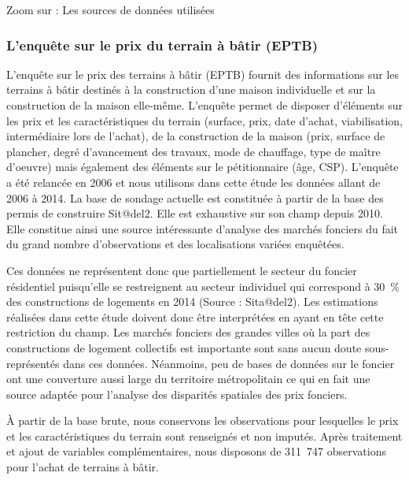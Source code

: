 \documentclass[10.5pt,a4paper]{article}
\newcommand\cadrevert[3]{
\begin{encadre}

\color{vert_n} \fontsize{14}{13}\selectfont Zoom sur : \color{black} \fontsize{14}{13}\selectfont #1
\vspace{4mm}


\color{vert_n} \fontsize{9}{10}\selectfont #2

{\setlength{\parindent}{5mm}%
\color{vert_n} \fontsize{9}{10}\selectfont #3
}
\end{encadre}
}
\begin{document}
{\newpage

\cadrevert{Les sources de données utilisées}{\subsubsection{L’enquête sur le prix du terrain à bâtir (EPTB)}

L’enquête sur le prix des terrains à bâtir (EPTB) fournit des informations sur les terrains à bâtir destinés à la construction d’une maison individuelle et sur la construction de la maison elle-même. L’enquête permet de disposer d’éléments sur les prix et les caractéristiques du terrain (surface, prix, date d’achat, viabilisation, intermédiaire lors de l'achat), de la construction de la maison 
(prix, surface de plancher, degré d’avancement des travaux, mode de chauffage, type de maître d’oeuvre) mais également des éléments sur le
pétitionnaire (âge, CSP). L’enquête a été relancée en 2006 et nous utilisons dans cette étude les données allant de 2006 à 2014. La base de sondage actuelle est constituée à partir de la base des permis de construire Sit@del2. Elle est exhaustive sur son champ depuis 2010. Elle constitue ainsi une source intéressante d'analyse des marchés fonciers du fait du grand nombre d'observations et des localisations variées enquêtées.\par}{  

Ces données ne représentent donc que partiellement le secteur du foncier résidentiel puisqu'elle se restreignent au secteur individuel qui correspond à 30~\% des constructions de logements en 2014 (Source : Sita@del2). Les estimations réalisées dans cette étude doivent donc être interprétées en ayant en tête cette restriction du champ. Les marchés fonciers des grandes villes où la part des constructions de logement collectifs est importante sont sans aucun doute sous-représentés dans ces données. Néanmoins, peu de bases de données sur le foncier ont une couverture aussi large du territoire métropolitain ce qui en fait une source adaptée pour l'analyse des disparités spatiales des prix fonciers. \par

\`{A} partir de la base brute, nous conservons les observations pour lesquelles le prix et les caractéristiques du terrain sont renseignés et non imputés. Après traitement et ajout de variables complémentaires, nous disposons de 311~747  observations pour l'achat de terrains à bâtir. \par

\vspace{0.2cm}

}}
\end{document}

